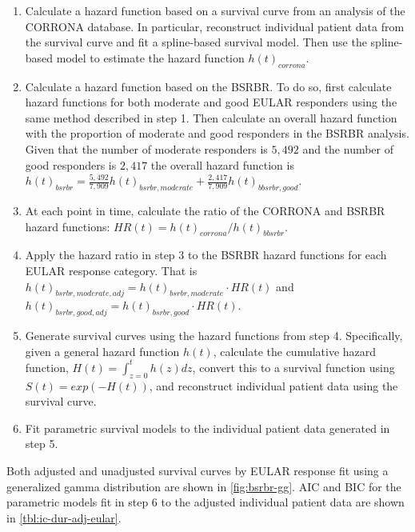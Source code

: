 \documentclass[11pt,final,fleqn]{article}\usepackage[]{graphicx}\usepackage[]{color}
\theoremstyle{plain}
\begin{document}
\begin{enumerate}
\def\labelenumi{\arabic{enumi}.}
\item Calculate a hazard function based on a survival curve from an analysis
  of the CORRONA database. In particular, reconstruct individual patient
  data from the survival curve \citep{guyot2012enhanced} and fit a
  spline-based survival model. Then use the spline-based model to
  estimate the hazard function $h(t)_{corrona}$.
\item Calculate a hazard function based on the BSRBR. To do so, first
  calculate hazard functions for both moderate and good EULAR responders
  using the same method described in step 1. Then calculate an overall
  hazard function with the proportion of moderate and good responders in
  the BSRBR analysis. Given that the number of moderate responders is
  \(5,492\) and the number of good responders is $2,417$ the overall
  hazard function is $h(t)_{bsrbr} = \frac{5,492}{7,909}h(t)_{bsrbr, moderate} + \frac{2,417}{7,909}h(t)_{bbsrbr, good}$.
\item At each point in time, calculate the ratio of the CORRONA and BSRBR
  hazard functions: $HR(t) = h(t)_{corrona}/h(t)_{bbsrbr}$.
\item Apply the hazard ratio in step 3 to the BSRBR hazard functions for
  each EULAR response category. That is $h(t)_{bsrbr, moderate, adj} = h(t)_{bsrbr, moderate} \cdot HR(t)$ and $h(t)_{bsrbr, good, adj} = h(t)_{bsrbr, good} \cdot HR(t)$.
\item Generate survival curves using the hazard functions from step 4.
  Specifically, given a general hazard function $h(t)$, calculate the
  cumulative hazard function, $H(t) = \int_{z = 0}^{t} h(z)dz$,
  convert this to a survival function using $S(t) = exp(-H(t))$, and
  reconstruct individual patient data using the survival curve.
\item Fit parametric survival models to the individual patient data
  generated in step 5.
\end{enumerate}

Both adjusted and unadjusted survival curves by EULAR response fit using a generalized gamma distribution are shown in \autoref{fig:bsrbr-gg}. AIC and BIC for the parametric models fit in step 6 to the adjusted individual patient data are shown in \autoref{tbl:ic-dur-adj-eular}.
\end{document}
